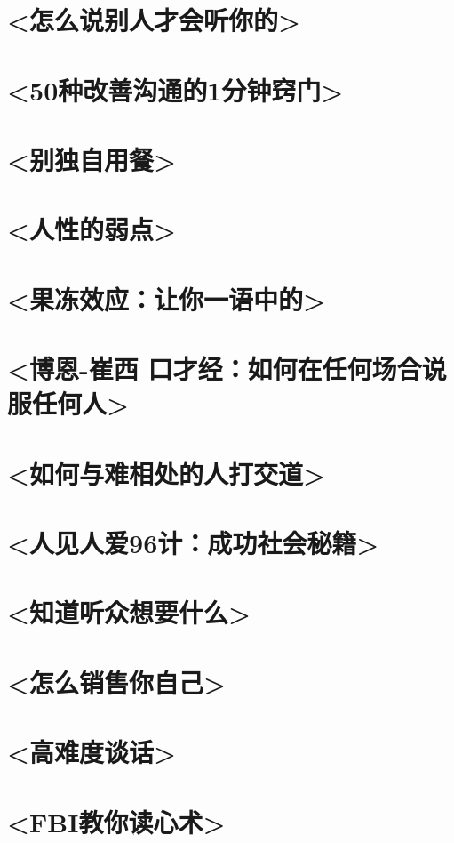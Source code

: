\documentclass[UTF8,a4paper,8pt]{ctexbook}
\begin{document}
	\section{<怎么说别人才会听你的>}
	
	\section{<50种改善沟通的1分钟窍门>}
	
	\section{<别独自用餐>}
	
	\section{<人性的弱点>}
	
	\section{<果冻效应：让你一语中的>}
	
	\section{<博恩-崔西 口才经：如何在任何场合说服任何人>}
	
	\section{<如何与难相处的人打交道>}
	
	\section{<人见人爱96计：成功社会秘籍>}
	
	\section{<知道听众想要什么>}
	
	\section{<怎么销售你自己>}
	
	\section{<高难度谈话>}
	
	\section{<FBI教你读心术>}
	
\end{document}
